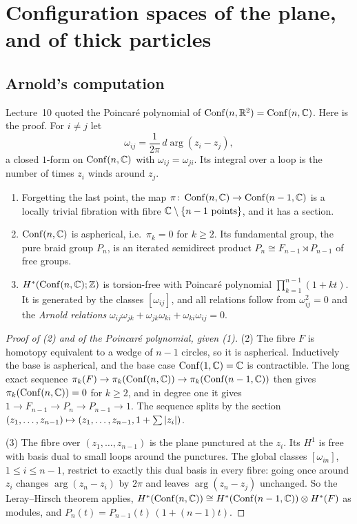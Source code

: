 \section{Configuration spaces of the plane, and of thick particles}
\label{TOP:sec:conf}

\subsection{Arnold's computation}

Lecture~10 quoted the Poincar\'e polynomial of $\operatorname{Conf}(n,\mathbb{R}^2)=\operatorname{Conf}(n,\mathbb{C})$. Here is the proof.
For $i\ne j$ let
\[
  \omega_{ij}=\frac1{2\pi}\,d\arg(z_i-z_j),
\]
a closed $1$-form on $\operatorname{Conf}(n,\mathbb{C})$ with $\omega_{ij}=\omega_{ji}$. Its integral over a loop is the number of
times $z_i$ winds around $z_j$.

\begin{theorem}\label{TOP:thm:arnold}
\begin{enumerate}[nosep]
\item Forgetting the last point, the map $\pi\colon\operatorname{Conf}(n,\mathbb{C})\to\operatorname{Conf}(n-1,\mathbb{C})$ is a locally trivial
  fibration with fibre $\mathbb{C}\setminus\{n-1\text{ points}\}$, and it has a section.
\item $\operatorname{Conf}(n,\mathbb{C})$ is aspherical, i.e.\ $\pi_k=0$ for $k\ge2$. Its fundamental group, the pure braid group
  $P_n$, is an iterated semidirect product $P_n\cong F_{n-1}\rtimes P_{n-1}$ of free groups.
\item $H^*(\operatorname{Conf}(n,\mathbb{C});\mathbb{Z})$ is torsion-free with Poincar\'e polynomial
  $\prod_{k=1}^{n-1}(1+kt)$. It is generated by the classes $[\omega_{ij}]$, and all relations follow from
  $\omega_{ij}^2=0$ and the \emph{Arnold relations} $\omega_{ij}\omega_{jk}+\omega_{jk}\omega_{ki}+\omega_{ki}\omega_{ij}=0$.
\end{enumerate}
\end{theorem}

\begin{proof}[Proof of (2) and of the Poincar\'e polynomial, given (1)]
(2) The fibre $F$ is homotopy equivalent to a wedge of $n-1$ circles, so it is aspherical. Inductively the base is
aspherical, and the base case $\operatorname{Conf}(1,\mathbb{C})=\mathbb{C}$ is contractible. The long exact sequence
$\pi_k(F)\to\pi_k(\operatorname{Conf}(n,\mathbb{C}))\to\pi_k(\operatorname{Conf}(n-1,\mathbb{C}))$ then gives $\pi_k(\operatorname{Conf}(n,\mathbb{C}))=0$ for $k\ge2$, and in
degree one it gives $1\to F_{n-1}\to P_n\to P_{n-1}\to1$. The sequence splits by the section
$(z_1,\dots,z_{n-1})\mapsto(z_1,\dots,z_{n-1},1+\sum\left\lvert z_i \right\rvert)$.

(3) The fibre over $(z_1,\dots,z_{n-1})$ is the plane punctured at the $z_i$. Its $H^1$ is free with
basis dual to small loops around the punctures. The global classes $[\omega_{in}]$, $1\le i\le n-1$,
restrict to exactly this dual basis in every fibre: going once around $z_i$ changes $\arg(z_n-z_i)$ by $2\pi$
and leaves $\arg(z_n-z_j)$ unchanged. So the Leray--Hirsch theorem applies, $H^*(\operatorname{Conf}(n,\mathbb{C}))\cong
H^*(\operatorname{Conf}(n-1,\mathbb{C}))\otimes H^*(F)$ as modules, and $P_n(t)=P_{n-1}(t)\,(1+(n-1)t)$.
\end{proof}

